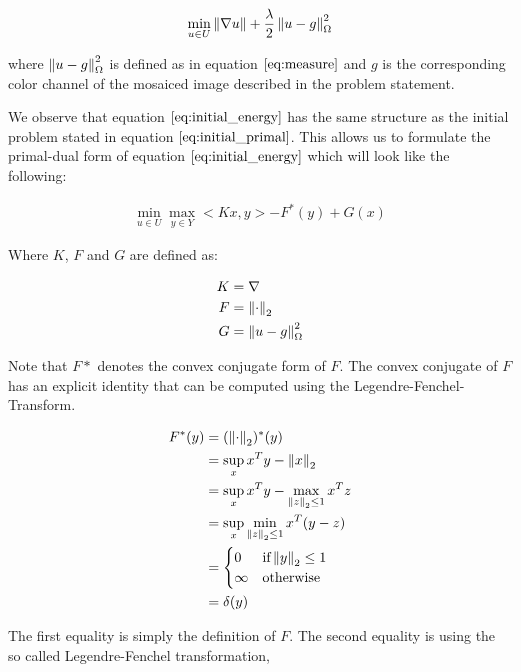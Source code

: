 \begin{equation}
\min_{u \in U} \left\lVert\nabla u\right\rVert + \frac{\lambda}{2} \left\lVert u - g\right\rVert^2_{\Omega}
\label{eq:initial_energy}
\end{equation}

where $\left\lVert u - g\right\rVert^2_{\Omega}$ is defined as in equation $\ref{eq:measure}$ and $g$ is the corresponding color channel of the mosaiced image described in the problem statement.

We observe that equation $\ref{eq:initial_energy}$ has the same structure as the initial problem stated in equation $\ref{eq:initial_primal}$. This allows us to formulate the primal-dual form of equation $\ref{eq:initial_energy}$ which will look like the following:

\begin{align}
	\min_{u \in U} \max_{y \in Y} < Kx, y > - F^*(y) + G(x)
\label{eq:initial_primal_dual}	
\end{align}

Where $K$, $F$ and $G$ are defined as:

\begin{align}
	K &= \nabla \nonumber \\
	F &= \left\lVert\cdot\right\rVert_2 \nonumber \\
	G &= \left\lVert u - g\right\rVert^2_{\Omega}
\label{eq:def_kfg}	
\end{align}

Note that $F*$ denotes the convex conjugate form of $F$. The convex conjugate of $F$ has an explicit identity that can be computed using the Legendre-Fenchel-Transform.

\begin{align}
	F^*(y) &= (\left\lVert\cdot\right\rVert_2)^*(y) \nonumber \\
		  &= \sup_x x^T y - \left\lVert x\right\rVert_2 \nonumber \\
		  &= \sup_x x^T y - \max_{\left\lVert z\right\rVert_2 \leq 1} x^T z \nonumber \\
		  &= \sup_x \min_{\left\lVert z\right\rVert_2 \leq 1} x^T(y-z) \nonumber \\
		  &= \begin{cases}
   				0  			& \text{if} \left\lVert y\right\rVert_2 \leq 1 \\
   				\infty      & \text{otherwise}
  			 \end{cases} \nonumber \\
  		  &= \delta(y)
\label{eq:legendre_fenchel_transform_f}  		  
\end{align}

The first equality is simply the definition of $F$. The second equality is using the so called Legendre-Fenchel transformation,

